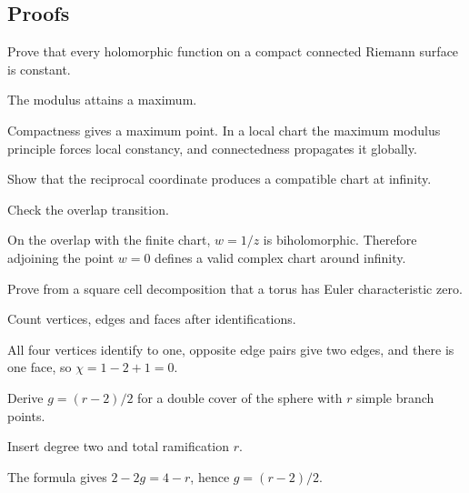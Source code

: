 \subsection*{Proofs}

\begin{exercise}\label{exr:iv26-expand-06}
Prove that every holomorphic function on a compact connected Riemann surface is constant.
\end{exercise}
\begin{hint}
The modulus attains a maximum.
\end{hint}
\begin{solution}
Compactness gives a maximum point. In a local chart the maximum modulus principle forces local constancy, and connectedness propagates it globally.
\end{solution}

\begin{exercise}\label{exr:iv26-expand-07}
Show that the reciprocal coordinate produces a compatible chart at infinity.
\end{exercise}
\begin{hint}
Check the overlap transition.
\end{hint}
\begin{solution}
On the overlap with the finite chart, \(w=1/z\) is biholomorphic. Therefore adjoining the point \(w=0\) defines a valid complex chart around infinity.
\end{solution}

\begin{exercise}\label{exr:iv26-expand-08}
Prove from a square cell decomposition that a torus has Euler characteristic zero.
\end{exercise}
\begin{hint}
Count vertices, edges and faces after identifications.
\end{hint}
\begin{solution}
All four vertices identify to one, opposite edge pairs give two edges, and there is one face, so \(\chi=1-2+1=0\).
\end{solution}

\begin{exercise}\label{exr:iv26-expand-09}
Derive \(g=(r-2)/2\) for a double cover of the sphere with \(r\) simple branch points.
\end{exercise}
\begin{hint}
Insert degree two and total ramification \(r\).
\end{hint}
\begin{solution}
The formula gives \(2-2g=4-r\), hence \(g=(r-2)/2\).
\end{solution}

